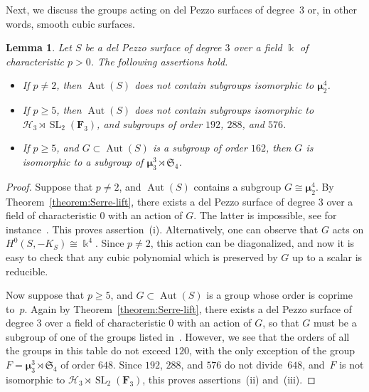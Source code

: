 \documentclass[12pt]{amsart}
\numberwithin{equation}{section}
\newtheorem{lemma}[subsection]{Lemma}
\theoremstyle{definition}
\newcommand{\mumu}{\boldsymbol{\mu}}
\newcommand{\HHH}{\mathscr{H}}
\DeclareMathOperator{\Aut}{Aut}
\DeclareMathOperator{\SL}{SL}
\def \ge {\geqslant}
\begin{document}
Next, we discuss the groups acting on del Pezzo surfaces of degree~$3$ or, in other
words, smooth cubic surfaces.

\begin{lemma}\label{lemma:dP3-forbidden}
Let $S$ be a del Pezzo surface of degree $3$ over a field $\Bbbk$ of characteristic $p>0$.
The following assertions hold.
\begin{itemize}
\item[(i)] If $p\neq 2$, then $\Aut(S)$ does not contain subgroups isomorphic
to $\mumu_2^4$.

\item[(ii)] If $p\ge 5$, then $\Aut(S)$ does not contain subgroups isomorphic
to~\mbox{$\HHH_3\rtimes\SL_2(\mathbf{F}_3)$},
and subgroups of order $192$, $288$, and $576$.

\item[(iii)] If $p\ge 5$, and $G\subset \Aut(S)$ is a subgroup of order $162$, then
$G$ is isomorphic to a subgroup of $ \mumu_3^3\rtimes\mathfrak{S}_4$.
\end{itemize}
\end{lemma}

\begin{proof}
Suppose that $p\neq 2$, and $\Aut(S)$ contains a subgroup $G\cong\mumu_2^4$.
By Theorem~\ref{theorem:Serre-lift}, there exists a
del Pezzo surface of degree $3$ over a field of characteristic $0$ with an action of $G$.
The latter is impossible, see for instance~\mbox{\cite[Table~9.6]{Dolgachev}}.
This proves assertion~(i). Alternatively, one can observe that $G$ acts on
$H^0(S, -K_S)\cong\Bbbk^4$. Since $p\neq 2$, this action can be diagonalized, and
now it is easy to check that any cubic polynomial which is preserved by $G$ up to
a scalar is reducible.

Now suppose that $p\ge 5$, and $G\subset \Aut(S)$ is a group whose order is coprime to~$p$.
Again by Theorem~\ref{theorem:Serre-lift}, there exists a
del Pezzo surface of degree $3$ over a field of characteristic $0$ with an action of $G$,
so that $G$ must be a subgroup of one of the groups listed in~\mbox{\cite[Table~9.6]{Dolgachev}}.
However, we see that the orders of all the groups in this table do not exceed $120$,
with the only exception of the group~\mbox{$F=\mumu_3^3\rtimes\mathfrak{S}_4$} of order $648$.
Since $192$, $288$, and $576$ do not divide~$648$, and~$F$ is not isomorphic to $\HHH_3\rtimes\SL_2(\mathbf{F}_3)$, this proves assertions~(ii) and~(iii).
\end{proof}
\end{document}
